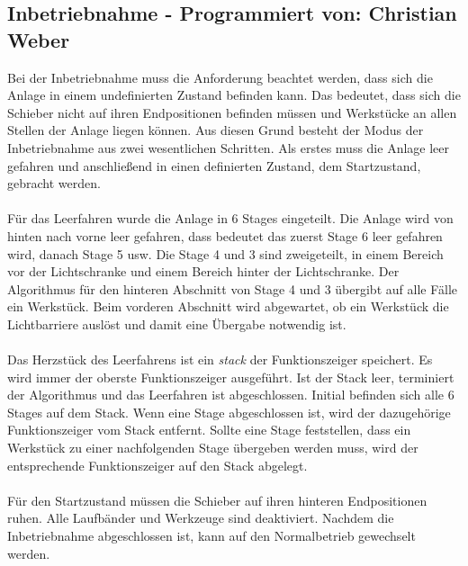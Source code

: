 \documentclass[fontsize=11pt,a4paper,final]{scrartcl}[2003/01/01]
\newcommand*{\chris}{%
	Programmiert von: Christian Weber
}
\begin{document}
\subsection{Inbetriebnahme - \chris}
Bei der Inbetriebnahme muss die Anforderung beachtet werden, dass sich die Anlage in einem undefinierten Zustand befinden kann. Das bedeutet, dass sich die Schieber nicht auf ihren Endpositionen befinden müssen und Werkstücke an allen Stellen der Anlage liegen können. Aus diesen Grund besteht der Modus der Inbetriebnahme aus zwei wesentlichen Schritten. Als erstes muss die Anlage leer gefahren und anschließend in einen definierten Zustand, dem Startzustand, gebracht werden.\\
\\
Für das Leerfahren wurde die Anlage in 6 Stages eingeteilt. Die Anlage wird von hinten nach vorne leer gefahren, dass bedeutet das zuerst Stage 6 leer gefahren wird, danach Stage 5 usw. Die Stage 4 und 3 sind zweigeteilt, in einem Bereich vor der Lichtschranke und einem Bereich hinter der Lichtschranke. Der Algorithmus für den hinteren Abschnitt von Stage 4 und 3 übergibt auf alle Fälle ein Werkstück. Beim vorderen Abschnitt wird abgewartet, ob ein Werkstück die Lichtbarriere auslöst und damit eine Übergabe notwendig ist.\\
\\
Das Herzstück des Leerfahrens ist ein \textit{stack} der Funktionszeiger speichert. Es wird immer der oberste Funktionszeiger ausgeführt. Ist der Stack leer, terminiert der Algorithmus und das Leerfahren ist abgeschlossen. Initial befinden sich alle 6 Stages auf dem Stack. Wenn eine Stage abgeschlossen ist, wird der dazugehörige Funktionszeiger vom Stack entfernt. Sollte eine Stage feststellen, dass ein Werkstück zu einer nachfolgenden Stage übergeben werden muss, wird der entsprechende Funktionszeiger auf den Stack abgelegt.\\
\\
Für den Startzustand müssen die Schieber auf ihren hinteren Endpositionen ruhen. Alle Laufbänder und Werkzeuge sind deaktiviert. Nachdem die Inbetriebnahme abgeschlossen ist, kann auf den Normalbetrieb gewechselt werden.
\end{document}
